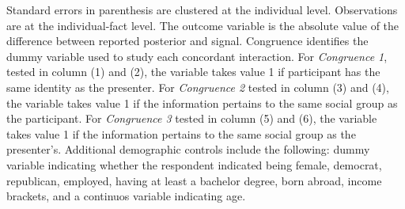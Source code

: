 \begin{table}[!h]
\begin{threeparttable}
\begin{tablenotes}[para]
\item Standard errors in parenthesis are clustered at the individual level. 
            Observations are at the individual-fact level. 
            The outcome variable is the absolute value of the difference between reported posterior and signal.
            Congruence identifies the dummy variable used to study each concordant interaction. 
            For \textit{Congruence 1}, tested in column (1) and (2), the variable takes value 1 if participant has the same identity as the presenter. 
            For \textit{Congruence 2} tested in column (3) and (4), the variable takes value 1 if the information pertains to the same social group as the participant.
            For \textit{Congruence 3} tested in column (5) and (6), the variable takes value 1 if the information pertains to the same social group as the presenter's.
            Additional demographic controls include the following: dummy variable indicating whether the respondent indicated being female, democrat, republican, employed, having at least a bachelor degree, born abroad, income brackets, and a continuos variable indicating age.
\end{tablenotes}
\end{threeparttable}
\end{table}
